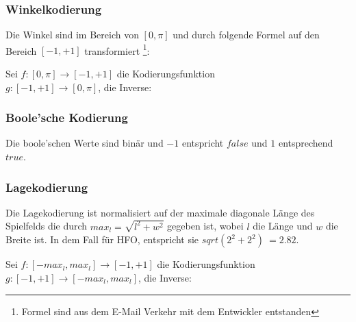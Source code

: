             \subsubsection*{Winkelkodierung}
                Die Winkel sind im Bereich von $[0, \pi]$ und durch folgende Formel auf den Bereich $[-1, +1]$ transformiert \footnote[1]{Formel sind aus dem E-Mail Verkehr mit dem Entwickler entstanden}:

                \begin{mdframed}
                    Sei $f : [0,\pi] \rightarrow [-1, +1]$ die Kodierungsfunktion \\
                    \hspace*{5mm} $g : [-1, +1] \rightarrow [0, \pi]$, die Inverse: \\[4mm]
                    \hspace*{10mm} 
                    \hspace*{20mm} 
                \end{mdframed}
                

            \subsubsection*{Boole'sche Kodierung}
                Die boole'schen Werte sind binär und $-1$ entspricht $false$ und $1$ entsprechend $true$.

            \subsubsection*{Lagekodierung}
                Die Lagekodierung ist normalisiert auf der maximale diagonale Länge des Spielfelds die durch $max_{l} = \sqrt{l^2 + w^2}$ gegeben ist, wobei $l$ die Länge und $w$ die Breite ist. In dem Fall für HFO, entspricht sie $sqrt(2^2 + 2^2) ~= 2.82$.\\

                \begin{mdframed}
                Sei $f : [-max_{l}, max_{l}] \rightarrow [-1, +1]$ die Kodierungsfunktion \\
                    \hspace*{5mm} $g : [-1, +1] \rightarrow [-max_{l}, max_{l}]$, die Inverse: \\[4mm]
                    \hspace*{25mm} 
                    \hspace*{20mm} 
                \end{mdframed}

